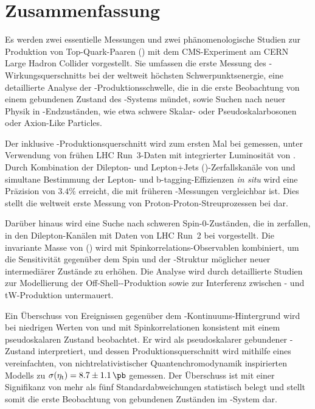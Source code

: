 \cleardoublepage %
\chapter*{Zusammenfassung}

\enlargethispage{\baselineskip}

Es werden zwei essentielle Messungen und zwei ph{\"a}nomenologische Studien zur Produktion von Top-Quark-Paaren (\ttbar) mit dem CMS-Experiment am CERN Large Hadron Collider vorgestellt. 
Sie umfassen die erste Messung des \ttbar-Wirkungsquerschnitts bei der weltweit h{\"o}chsten Schwerpunktsenergie, eine detaillierte Analyse der \ttbar-Produktionsschwelle, die in die erste Beobachtung von einem gebundenen Zustand des \ttbar-Systems m{\"u}ndet, sowie Suchen nach neuer Physik in \ttbar-Endzust{\"a}nden, wie etwa schwere Skalar- oder Pseudoskalarbosonen oder Axion-Like Particles.

Der inklusive \ttbar-Produktionsquerschnitt \sigmatt wird zum ersten Mal bei \sqrtsRIII gemessen, unter Verwendung von fr{\"u}hen LHC Run~3-Daten mit integrierter Luminosit{\"a}t von \lumiRIII. Durch Kombination der Dilepton- und Lepton+Jets (\ljets)-Zerfallskan{\"a}le von \ttbar und simultane Bestimmung der Lepton- und b-tagging-Effizienzen \textit{in situ} wird eine Pr{\"a}zision von $3.4\%$ erreicht, die mit fr{\"u}heren \sigmatt-Messungen vergleichbar ist. 
Dies stellt die weltweit erste Messung von Proton-Proton-Streuprozessen bei \sqrtsRIII dar.


Dar{\"u}ber hinaus wird eine Suche nach schweren Spin-0-Zust{\"a}nden, die in \ttbar zerfallen, in den Dilepton-Kan{\"a}len mit \lumiRII Daten von LHC Run~2 bei \sqrtsRII vorgestellt. Die invariante Masse von \ttbar (\mtt) wird mit Spinkorrelations-Observablen kombiniert, um die Sensitivit{\"a}t gegen{\"u}ber dem Spin und der \CP-Struktur m{\"o}glicher neuer intermedi{\"a}rer Zust{\"a}nde zu erh{\"o}hen. 
Die Analyse wird durch detaillierte Studien zur Modellierung der Off-Shell-\ttbar-Produktion sowie zur Interferenz zwischen \ttbar- und tW-Produktion untermauert.

Ein {\"U}berschuss von Ereignissen gegen{\"u}ber dem \ttbar-Kontinuums-Hintergrund wird bei niedrigen Werten von \mtt und mit Spinkorrelationen konsistent mit einem pseudoskalaren Zustand beobachtet. Er wird als pseudoskalarer gebundener \ttbar-Zustand \etat interpretiert, und dessen Produktionsquerschnitt wird mithilfe eines vereinfachten, von nichtrelativistischer Quantenchromodynamik inspirierten Modells zu $\sigetat =  8.7 \pm 1.1  \, \si{\pb}$ gemessen. 
Der {\"U}berschuss ist mit einer Signifikanz von mehr als f{\"u}nf Standardabweichungen statistisch belegt und stellt somit die erste Beobachtung von gebundenen Zust{\"a}nden im \ttbar-System dar.

